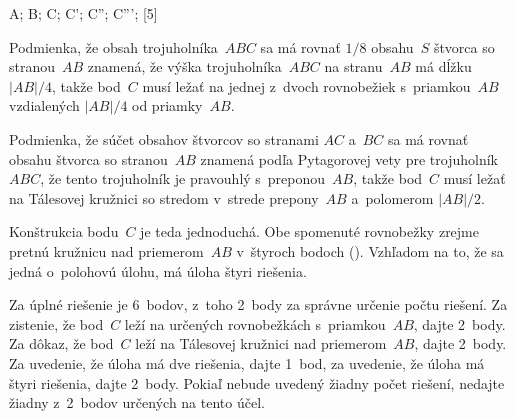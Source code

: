 {%
\fontplace
\rpoint A; \lpoint B; \blpoint C; \brpoint C';
\trpoint C''; \tlpoint C''';
[5] \hfil\Obr

Podmienka, že obsah trojuholníka~$ABC$ sa má rovnať $1/8$
obsahu~$S$ štvorca so stranou~$AB$ znamená, že výška trojuholníka~$ABC$
na stranu~$AB$ má dĺžku $|AB|/4$, takže bod~$C$
musí ležať na jednej z~dvoch rovnobežiek s~priamkou~$AB$ vzdialených
$|AB|/4$ od priamky~$AB$.

Podmienka, že súčet obsahov štvorcov so stranami $AC$ a~$BC$ sa má
rovnať obsahu štvorca so stranou~$AB$ znamená podľa Pytagorovej
vety pre trojuholník~$ABC$, že tento trojuholník je pravouhlý
s~preponou~$AB$, takže bod~$C$ musí ležať na Tálesovej kružnici so stredom
v~strede prepony~$AB$ a~polomerom $|AB|/2$.

Konštrukcia bodu~$C$ je teda jednoduchá. Obe spomenuté rovnobežky
zrejme pretnú kružnicu nad priemerom~$AB$ v~štyroch bodoch (\obr).
Vzhľadom na to, že sa jedná o~polohovú úlohu, má úloha štyri
riešenia.

\inspicture{}

\nobreak\medskip\petit\noindent
Za úplné riešenie je 6~bodov, z~toho 2~body za správne určenie počtu
riešení. Za zistenie, že bod~$C$ leží na určených rovnobežkách
s~priamkou~$AB$, dajte 2~body. Za dôkaz, že bod~$C$ leží na
Tálesovej kružnici nad priemerom~$AB$, dajte 2~body. Za uvedenie,
že úloha má dve riešenia, dajte 1~bod, za uvedenie, že úloha má
štyri riešenia, dajte 2~body. Pokiaľ nebude uvedený žiadny počet
riešení, nedajte žiadny z~2~bodov určených na tento účel.

\endpetit
\bigbreak}

